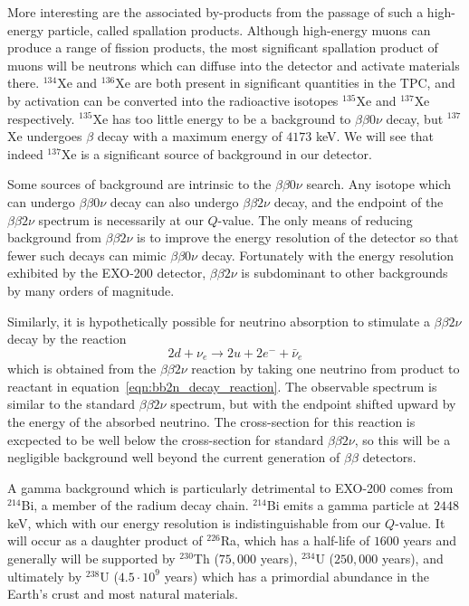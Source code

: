 More interesting are the associated by-products from the passage of such a high-energy particle, called spallation products.  Although high-energy muons can produce a range of fission products, the most significant spallation product of muons will be neutrons which can diffuse into the detector and activate materials there.  $^{134}$Xe and $^{136}$Xe are both present in significant quantities in the TPC, and by activation can be converted into the radioactive isotopes $^{135}$Xe and $^{137}$Xe respectively.  $^{135}$Xe has too little energy to be a background to $\beta\beta 0\nu$ decay, but $^{137}$Xe undergoes $\beta$ decay with a maximum energy of $4173$ keV.  We will see that indeed $^{137}$Xe is a significant source of background in our detector.

Some sources of background are intrinsic to the $\beta\beta 0\nu$ search.  Any isotope which can undergo $\beta\beta 0\nu$ decay can also undergo $\beta\beta 2\nu$ decay, and the endpoint of the $\beta\beta 2\nu$ spectrum is necessarily at our $Q$-value.  The only means of reducing background from $\beta\beta 2\nu$ is to improve the energy resolution of the detector so that fewer such decays can mimic $\beta\beta 0\nu$ decay.  Fortunately with the energy resolution exhibited by the EXO-200 detector, $\beta\beta 2\nu$ is subdominant to other backgrounds by many orders of magnitude.

Similarly, it is hypothetically possible for neutrino absorption to stimulate a $\beta\beta 2\nu$ decay by the reaction
\begin{equation}
2d + \nu_e \rightarrow 2u + 2e^- + \bar{\nu}_e
\end{equation}
which is obtained from the $\beta\beta 2\nu$ reaction by taking one neutrino from product to reactant in equation~\ref{eqn:bb2n_decay_reaction}.  The observable spectrum is similar to the standard $\beta\beta 2\nu$ spectrum, but with the endpoint shifted upward by the energy of the absorbed neutrino.  The cross-section for this reaction is excpected to be well below the cross-section for standard $\beta\beta 2\nu$, so this will be a negligible background well beyond the current generation of $\beta\beta$ detectors.

A gamma background which is particularly detrimental to EXO-200 comes from $^{214}$Bi, a member of the radium decay chain.  $^{214}$Bi emits a gamma particle at $2448$ keV, which with our energy resolution is indistinguishable from our $Q$-value.  It will occur as a daughter product of $^{226}$Ra, which has a half-life of $1600$ years and generally will be supported by $^{230}$Th ($75,000$ years), $^{234}$U ($250,000$ years), and ultimately by $^{238}$U ($4.5 \cdot 10^9$ years) which has a primordial abundance in the Earth's crust and most natural materials.


